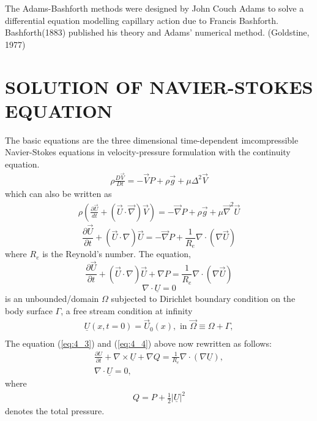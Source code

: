 \documentclass[11pt]{report}
\newcommand{\sps}{\\[0.2cm]}
\newcommand{\refn}[1]{(\ref{#1})}
\newcommand{\refx}[1]{\refn{eq:#1}}
\newcommand{\NI}{\noindent}
\begin{document}
	\NI The Adams-Bashforth methods were designed by John Couch Adams to solve a differential equation modelling capillary action due to Francis Bashforth. Bashforth(1883) published his theory and Adams' numerical method. (Goldstine, 1977)
	
	
	\chapter{SOLUTION OF NAVIER-STOKES EQUATION}
	The basic equations are the three dimensional time-dependent imcompressible Navier-Stokes equations in velocity-pressure formulation with the continuity equation.
	\begin{eqnarray}
		\rho\frac{D\vec{V}}{Dt} = -\vec{V} P + \rho\vec{g} + \mu \Delta^2\vec{V}
	\end{eqnarray}
	which can also be written as
	\begin{eqnarray}
		\rho\left(\frac{\partial \vec{U}}{dt} + (\vec{U}\cdot \vec{\nabla})\vec{V}\right) = -\vec{\nabla}P + \rho\vec{g} + \mu\vec{\nabla}^2\vec{U}
	\end{eqnarray}
	\begin{equation*}
		\frac{\partial\vec{U}}{\partial t} + (\vec{U}\cdot\nabla)\vec{U} = -\vec{\nabla}P + \frac{1}{R_e} \nabla \cdot (\nabla\vec{U})
	\end{equation*}
	where $R_e$ is the Reynold's number. The equation,
	\begin{equation}
		\frac{\partial \vec{U}}{\partial t} + (\vec{U}\cdot\nabla)\vec{U} + \nabla P = \frac{1}{R_e}\nabla\cdot(\nabla\vec{U})\label{eq:4_3}
	\end{equation}
	\begin{equation}
		\nabla \cdot \underline{U} = 0\label{eq:4_4}
	\end{equation}
	is an unbounded/domain $\Omega$ subjected to Dirichlet boundary condition on the body surface $\Gamma$, a free stream condition at infinity
	\begin{eqnarray*}
		\underline{U}(x,t=0) = \vec{U}_0(x), \text{ in } \vec{\Omega} \equiv \Omega + \Gamma,\sps
	\end{eqnarray*}
	The equation \refx{4_3} and \refx{4_4} above now rewritten as follows:
	\begin{gather}
		\frac{\partial U}{\partial t} + \nabla\times\underline{U} + \nabla Q = \frac{1}{R_e}\nabla \cdot (\nabla\underline{U}),\label{eq:4_5}\sps
		\nabla\cdot\underline{U} = 0,\label{eq:4_6}
	\end{gather}
	where 
	\begin{eqnarray*}
		Q = P + \frac{1}{2}\Bigg|\underline{U}\Bigg|^2
	\end{eqnarray*}
	denotes the total pressure.\\
	
\end{document}
